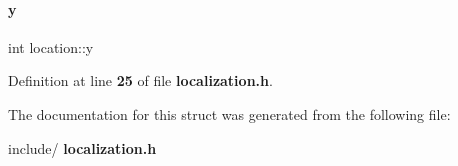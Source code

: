 \mbox{\label{structlocation_ad7197d1981d4ea5d8b36041473cac815}} 
\paragraph{y}
{\footnotesize\ttfamily int location\+::y}



Definition at line \textbf{ 25} of file \textbf{ localization.\+h}.



The documentation for this struct was generated from the following file\+:\begin{DoxyCompactItemize}
\item 
include/\textbf{ localization.\+h}\end{DoxyCompactItemize}
